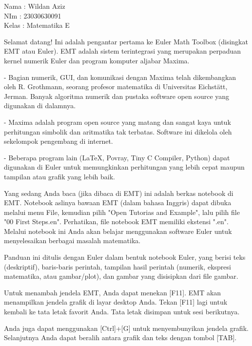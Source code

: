 \documentclass[a4paper,10pt]{article}
\begin{document}
\begin{eulernotebook}
\begin{eulercomment}
Nama  : Wildan Aziz\\
NIm   : 23030630091\\
Kelas : Matematika E

\begin{eulercomment}
\begin{eulercomment}
Selamat datang! Ini adalah pengantar pertama ke Euler Math Toolbox
(disingkat EMT atau Euler). EMT adalah sistem terintegrasi yang
merupakan perpaduan kernel numerik Euler dan program komputer aljabar
Maxima.

- Bagian numerik, GUI, dan komunikasi dengan Maxima telah dikembangkan
oleh R. Grothmann, seorang profesor matematika di Universitas
Eichstätt, Jerman. Banyak algoritma numerik dan pustaka software open
source yang digunakan di dalamnya.

- Maxima adalah program open source yang matang dan sangat kaya untuk
perhitungan simbolik dan aritmatika tak terbatas. Software ini
dikelola oleh sekelompok pengembang di internet.

- Beberapa program lain (LaTeX, Povray, Tiny C Compiler, Python) dapat
digunakan di Euler untuk memungkinkan perhitungan yang lebih cepat
maupun tampilan atau grafik yang lebih baik.

Yang sedang Anda baca (jika dibaca di EMT) ini adalah berkas notebook
di EMT. Notebook aslinya bawaan EMT (dalam bahasa Inggris) dapat
dibuka melalui menu File, kemudian pilih "Open Tutorias and Example",
lalu pilih file "00 First Steps.en". Perhatikan, file notebook EMT
memiliki ekstensi ".en". Melalui notebook ini Anda akan belajar
menggunakan software Euler untuk menyelesaikan berbagai masalah
matematika.
\end{eulercomment}
\begin{eulercomment}
Panduan ini ditulis dengan Euler dalam bentuk notebook Euler, yang
berisi teks (deskriptif), baris-baris perintah, tampilan hasil
perintah (numerik, ekspresi matematika, atau gambar/plot), dan gambar
yang disisipkan dari file gambar.

Untuk menambah jendela EMT, Anda dapat menekan [F11]. EMT akan
menampilkan jendela grafik di layar desktop Anda. Tekan [F11] lagi
untuk kembali ke tata letak favorit Anda. Tata letak disimpan untuk
sesi berikutnya.

Anda juga dapat menggunakan [Ctrl]+[G] untuk menyembunyikan jendela
grafik. Selanjutnya Anda dapat beralih antara grafik dan teks dengan
tombol [TAB].


\end{eulercomment}
\end{eulercomment}
\end{eulercomment}
\end{eulernotebook}
\end{document}
